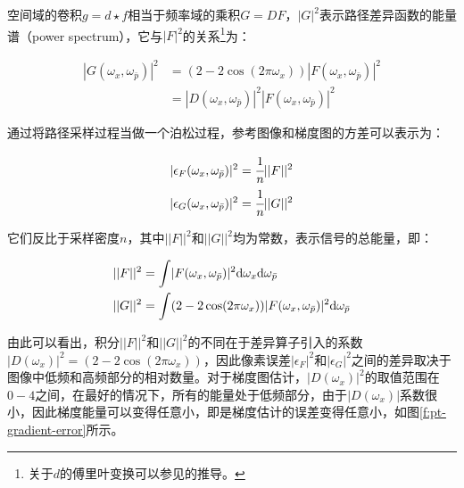 空间域的卷积$g=d\star f$相当于频率域的乘积$G=DF$，$|G|^2$表示路径差异函数的能量谱（power spectrum），它与$|F|^2$的关系\footnote{关于$d$的傅里叶变换可以参见\cite{a:SupplementalMaterialforGradientDomainPathTracing}的推导。}为：

\begin{equation}
\begin{aligned}
	|G(\omega_x,\omega_{\bar{p}})|^{2}&=(2-2\cos(2\pi\omega_x))|F(\omega_x,\omega_{\bar{p}})|^{2}\\
	&=|D(\omega_x,\omega_{\bar{p}})|^{2}|F(\omega_x,\omega_{\bar{p}})|^{2}
\end{aligned}
\end{equation}

\noindent \cite{a:GradientDomainPathTracing}通过将路径采样过程当做一个泊松过程，参考图像和梯度图的方差可以表示为：

\begin{equation}
	\begin{aligned}
		|\epsilon_F (\omega_x,\omega_{\bar{p}}) |^2 &= \cfrac{1}{n}||F||^2 \\
		|\epsilon_G (\omega_x,\omega_{\bar{p}}) |^2 &= \cfrac{1}{n}||G||^2
	\end{aligned}
\end{equation}

\noindent 它们反比于采样密度$n$，其中$||F||^2$和$||G||^2$均为常数，表示信号的总能量，即：

\begin{equation}
\begin{aligned}
	||F||^2 &={\rm \int} |F(\omega_x,\omega_{\bar{p}})|^{2}{\rm d}\omega_x {\rm d}\omega_{\bar{p}}\\
	||G||^2 &={\rm \int} (2-2\cos(2\pi\omega_x))|F(\omega_x,\omega_{\bar{p}})|^{2} {\rm d}\omega_{\bar{p}}	
\end{aligned}
\end{equation}

\noindent 由此可以看出，积分$||F||^2$和$||G||^2$的不同在于差异算子引入的系数$|D(\omega_x)|^2=(2-2\cos (2\pi\omega_x))$，因此像素误差$|\epsilon_F |^2$和$|\epsilon_G |^2$之间的差异取决于图像中低频和高频部分的相对数量。对于梯度图估计，$|D(\omega_x)|^2$的取值范围在$0-4$之间，在最好的情况下，所有的能量处于低频部分，由于$|D(\omega_x)|$系数很小，因此梯度能量可以变得任意小，即是梯度估计的误差变得任意小，如图\ref{f:pt-gradient-error}所示。

